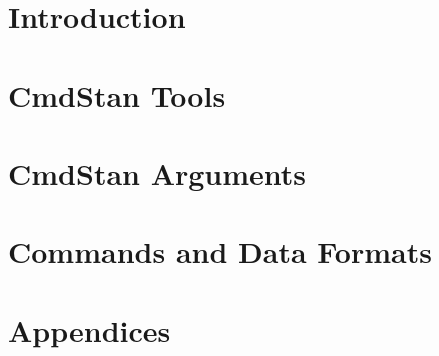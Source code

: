 \documentclass[10pt,openany]{book}
\newcommand{\CmdStan}{CmdStan\xspace}
\begin{document}
\pagestyle{plain}

\frontmatter

\tableofcontents

\mainmatter
\part{Introduction}



\part{\CmdStan Tools}

\part{\CmdStan Arguments}

\part{Commands and Data Formats}





\appendix
\part*{Appendices}





\backmatter 
\end{document}
